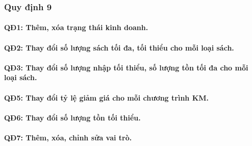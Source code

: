 \documentclass[12pt]{report}
\begin{document}
            \subsubsection{Quy định 9}
                \paragraph{QĐ1: Thêm, xóa trạng thái kinh doanh.}
                \paragraph{QĐ2: Thay đổi số lượng sách tối đa, tối thiểu cho mỗi loại sách.}
                \paragraph{QĐ3: Thay đổi số lượng nhập tối thiểu, số lượng tồn tối đa cho mỗi loại sách.}
                \paragraph{QĐ5: Thay đổi tỷ lệ giảm giá cho mỗi chương trình KM.}
                \paragraph{QĐ6: Thay đổi số lượng tồn tối thiểu.}
                \paragraph{QĐ7: Thêm, xóa, chỉnh sửa vai trò.}
            \pagebreak
\end{document}
